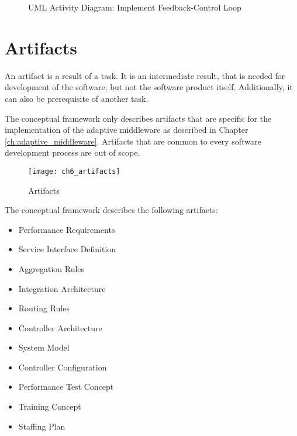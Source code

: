 \begin{figure}[htpb] \centering 
	\qquad
	\caption{\ac{UML} Activity Diagram: Implement Feedback-Control Loop} 
\end{figure}

\section{Artifacts}\label{sec:ch6_artifacts}

An artifact is a result of a task. It is an intermediate result, that is needed for development of the software, but not the software product itself. Additionally, it can also be prerequisite of another task. 

The conceptual framework only describes artifacts that are specific for the implementation of the adaptive middleware as described in Chapter \ref{ch:adaptive_middleware}. Artifacts that are common to every software development process are out of scope.

\begin{figure}[htpb] \centering 
	\texttt{[image: ch6\_artifacts]} 
	\caption{Artifacts} 
	\label{fig:ch6_artifacts} 
\end{figure}

The conceptual framework describes the following artifacts:

\begin{itemize}
	\item Performance Requirements
	\item Service Interface Definition
	\item Aggregation Rules
	\item Integration Architecture
	\item Routing Rules
	\item Controller Architecture
	\item System Model
	\item Controller Configuration
	\item Performance Test Concept
	\item Training Concept
	\item Staffing Plan
\end{itemize}

